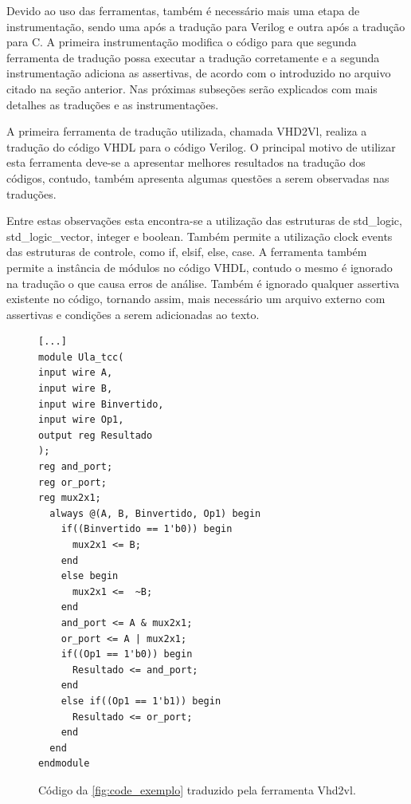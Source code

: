 \par
Devido ao uso das ferramentas, também é necessário mais uma etapa de instrumentação, sendo uma após a tradução para Verilog e outra após a tradução para C. A primeira instrumentação modifica o código para que segunda ferramenta de tradução possa executar a tradução corretamente e a segunda instrumentação adiciona as assertivas, de acordo com o introduzido no arquivo citado na seção anterior. Nas próximas subseções serão explicados com mais detalhes as traduções e as instrumentações.


\par
A primeira ferramenta de tradução utilizada, chamada VHD2Vl\cite{vhd2vl}, realiza a tradução do código VHDL para o código Verilog. O principal motivo de utilizar esta ferramenta deve-se a apresentar melhores resultados na tradução dos códigos, contudo, também apresenta algumas questões a serem observadas nas traduções. 

\par
Entre estas observações esta encontra-se a utilização das estruturas de std\_logic, std\_logic\_vector, integer e boolean. Também permite a utilização clock events das estruturas de controle, como if, elsif, else, case. A ferramenta também permite a instância de módulos no código VHDL, contudo o mesmo é ignorado na tradução o que causa erros de análise. Também é ignorado qualquer assertiva existente no código, tornando assim, mais necessário um arquivo externo com assertivas e condições a serem adicionadas ao texto\cite{vhd2vl}. 


\begin{figure}[H]
\caption{\label{fig:codigo_verilog} Código da \autoref{fig:code_exemplo} traduzido pela ferramenta Vhd2vl.}
	\begin{center}
    \begin{minipage}{0.7\textwidth}
    \begin{lstlisting}
[...]
module Ula_tcc(
input wire A,
input wire B,
input wire Binvertido,
input wire Op1,
output reg Resultado
);
reg and_port;
reg or_port;
reg mux2x1;
  always @(A, B, Binvertido, Op1) begin
    if((Binvertido == 1'b0)) begin
      mux2x1 <= B;
    end
    else begin
      mux2x1 <=  ~B;
    end
    and_port <= A & mux2x1;
    or_port <= A | mux2x1;
    if((Op1 == 1'b0)) begin
      Resultado <= and_port;
    end
    else if((Op1 == 1'b1)) begin
      Resultado <= or_port;
    end
  end
endmodule
    \end{lstlisting}
    \end{minipage}
	\end{center}
\end{figure}

